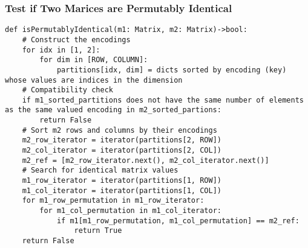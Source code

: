 \documentclass{article}
\begin{document}
\subsubsection{Test if Two Marices are Permutably Identical}
\begin{lstlisting}
def isPermutablyIdentical(m1: Matrix, m2: Matrix)->bool:
    # Construct the encodings
    for idx in [1, 2]:
        for dim in [ROW, COLUMN]:
            partitions[idx, dim] = dicts sorted by encoding (key) whose values are indices in the dimension
    # Compatibility check
    if m1_sorted_partitions does not have the same number of elements as the same valued encoding in m2_sorted_partions:
        return False
    # Sort m2 rows and columns by their encodings
    m2_row_iterator = iterator(partitions[2, ROW])
    m2_col_iterator = iterator(partitions[2, COL])
    m2_ref = [m2_row_iterator.next(), m2_col_iterator.next()]
    # Search for identical matrix values
    m1_row_iterator = iterator(partitions[1, ROW])
    m1_col_iterator = iterator(partitions[1, COL])
    for m1_row_permutation in m1_row_iterator:
        for m1_col_permutation in m1_col_iterator:
            if m1[m1_row_permutation, m1_col_permutation] == m2_ref:
                return True
    return False
\end{lstlisting}

\end{document}
